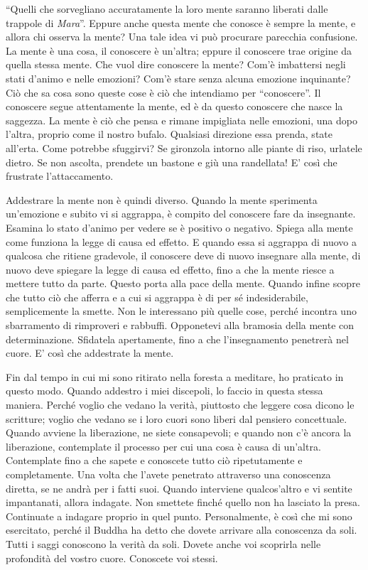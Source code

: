 ``Quelli che sorvegliano accuratamente la loro mente saranno liberati
dalle trappole di \emph{Mara}''.%
Eppure anche
questa mente che conosce è sempre la mente, e allora chi osserva la
mente? Una tale idea vi può procurare parecchia confusione. La mente è
una cosa, il conoscere è un'altra; eppure il conoscere trae origine da
quella stessa mente. Che vuol dire conoscere la mente? Com'è imbattersi
negli stati d'animo e nelle emozioni? Com'è stare senza alcuna emozione
inquinante? Ciò che sa cosa sono queste cose è ciò che intendiamo per
``conoscere''. Il conoscere segue attentamente la mente, ed è da questo
conoscere che nasce la saggezza. La mente è ciò che pensa e rimane
impigliata nelle emozioni, una dopo l'altra, proprio come il nostro
bufalo. Qualsiasi direzione essa prenda, state all'erta. Come potrebbe
sfuggirvi? Se gironzola intorno alle piante di riso, urlatele dietro. Se
non ascolta, prendete un bastone e giù una randellata! E' così che
frustrate l'attaccamento.

Addestrare la mente non è quindi diverso. Quando la mente sperimenta
un'emozione e subito vi si aggrappa, è compito del conoscere fare da
insegnante. Esamina lo stato d'animo per vedere se è positivo o
negativo. Spiega alla mente come funziona la legge di causa ed effetto.
E quando essa si aggrappa di nuovo a qualcosa che ritiene gradevole, il
conoscere deve di nuovo insegnare alla mente, di nuovo deve spiegare la
legge di causa ed effetto, fino a che la mente riesce a mettere tutto da
parte. Questo porta alla pace della mente. Quando infine scopre che
tutto ciò che afferra e a cui si aggrappa è di per sé indesiderabile,
semplicemente la smette. Non le interessano più quelle cose, perché
incontra uno sbarramento di rimproveri e rabbuffi. Opponetevi alla
bramosia della mente con determinazione. Sfidatela apertamente, fino a
che l'insegnamento penetrerà nel cuore. E' così che addestrate la mente.

Fin dal tempo in cui mi sono ritirato nella foresta a meditare, ho
praticato in questo modo. Quando addestro i miei discepoli, lo faccio in
questa stessa maniera. Perché voglio che vedano la verità, piuttosto che
leggere cosa dicono le scritture; voglio che vedano se i loro cuori sono
liberi dal pensiero concettuale. Quando avviene la liberazione, ne siete
consapevoli; e quando non c'è ancora la liberazione, contemplate il
processo per cui una cosa è causa di un'altra. Contemplate fino a che
sapete e conoscete tutto ciò ripetutamente e completamente. Una volta
che l'avete penetrato attraverso una conoscenza diretta, se ne andrà per
i fatti suoi. Quando interviene qualcos'altro e vi sentite impantanati,
allora indagate. Non smettete finché quello non ha lasciato la presa.
Continuate a indagare proprio in quel punto. Personalmente, è così che
mi sono esercitato, perché il Buddha ha detto che dovete arrivare alla
conoscenza da soli. Tutti i saggi conoscono la verità da soli. Dovete
anche voi scoprirla nelle profondità del vostro cuore. Conoscete voi
stessi.

